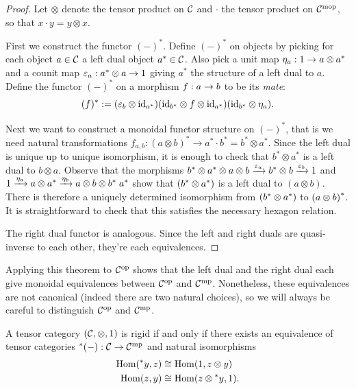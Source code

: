 \documentclass{amsart}
\begin{document}
\begin{proof}
Let $\otimes$ denote the tensor product on $\mathcal C$ and $\cdot$ the tensor product on $\mathcal C^{\mathrm{mop}}$, so that $x \cdot y = y \otimes x$.

First we construct the functor ${(-)^*}$.  Define ${(-)^*}$ on objects by picking for each object $a \in \mathcal C$ a left dual object ${a^*} \in \mathcal C$.  Also pick a unit map $\eta_a: 1 \rightarrow a \otimes {a^*}$ and a counit map  $\varepsilon_a: {a^*} \otimes a \rightarrow 1$  giving ${a^*}$ the structure of a left dual to $a$.  Define the functor ${(-)^*}$ on a morphism $f: a \rightarrow b$ to be its {\em mate}: 
\begin{equation*}
	{(f)^*} := (\varepsilon_b \otimes \mathrm{id}_{{a}^*}) (\mathrm{id}_{{b}^*} \otimes f \otimes \mathrm{id}_{{a}^*}) (\mathrm{id}_{{b}^*} \otimes \eta_a).
\end{equation*}

Next we want to construct a monoidal functor structure on $(-)^*$, that is we need natural transformations $f_{a,b}: (a \otimes b)^* \rightarrow a^* \cdot b^* = b^* \otimes a^*$.  Since the left dual is unique up to unique isomorphism, it is enough to check that $b^* \otimes a^*$ is a left dual to $b \otimes a$.  Observe that the morphisms ${b}^* \otimes {a}^* \otimes a \otimes b \xrightarrow{\varepsilon_a} {b}^* \otimes b \xrightarrow{\varepsilon_b} 1$ and $1 \xrightarrow{\eta_a} a \otimes {a}^* \xrightarrow{\eta_b} a \otimes b \otimes {b}^* \; {a}^*$ show that $({b}^* \otimes {a}^*)$ is a left dual to $(a \otimes b)$.  There is therefore a uniquely determined isomorphism from $({b}^* \otimes {a}^*)$ to ${(a \otimes b)}^*$.  It is straightforward to check that this satisfies the necessary hexagon relation.

The right dual functor is analogous.  Since the left and right duals are quasi-inverse to each other, they're each equivalences.
\end{proof}
\begin{remark}
Applying this theorem to $\mathcal C^{\mathrm{op}}$ shows that the left dual and the right dual each give monoidal equivalences between $\mathcal C^{\mathrm{op}}$ and $\mathcal C^{\mathrm{mp}}$.  Nonetheless, these equivalences are not canonical (indeed there are two natural choices), so we will always be careful to distinguish  $\mathcal C^{\mathrm{op}}$ and $\mathcal C^{\mathrm{mp}}$.
\end{remark}

\begin{corollary} \label{cor:RigidityViaFunctors}
	A tensor category $(\mathcal C, \otimes, 1)$ is rigid if and only if there exists an equivalence of tensor categories ${{}^*(-)}: \mathcal C \to \mathcal C^{\mathrm{mp}}$ and natural isomorphisms
	\begin{align*}
		\operatorname{Hom}( {}^*y, z) &\cong \operatorname{Hom}(1, z \otimes y) \\
		\operatorname{Hom}(z, y) & \cong \operatorname{Hom}(z \otimes {}^*y, 1).
	\end{align*}
\end{corollary}
\end{document}
